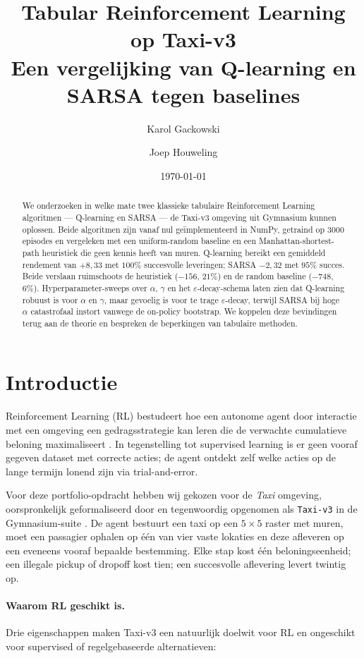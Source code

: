 \documentclass[11pt,a4paper]{article}
\title{\textbf{Tabular Reinforcement Learning op Taxi-v3} \\
       \large Een vergelijking van Q-learning en SARSA tegen baselines}
\author{Karol Gackowski \and Joep Houweling}
\date{\today}
\begin{document}
\maketitle

\begin{abstract}
\noindent
We onderzoeken in welke mate twee klassieke tabulaire Reinforcement
Learning algoritmen --- Q-learning en SARSA --- de Taxi-v3 omgeving uit
Gymnasium kunnen oplossen. Beide algoritmen zijn vanaf nul ge\"implementeerd
in NumPy, getraind op 3000 episodes en vergeleken met een uniform-random
baseline en een Manhattan-shortest-path heuristiek die geen kennis heeft
van muren. Q-learning bereikt een gemiddeld rendement van $+8{,}33$ met
$100\%$ succesvolle leveringen; SARSA $-2{,}32$ met $95\%$ succes. Beide
verslaan ruimschoots de heuristiek ($-156$, $21\%$) en de random baseline
($-748$, $6\%$). Hyperparameter-sweeps over $\alpha$, $\gamma$ en het
$\varepsilon$-decay-schema laten zien dat Q-learning robuust is voor
$\alpha$ en $\gamma$, maar gevoelig is voor te trage $\varepsilon$-decay,
terwijl SARSA bij hoge $\alpha$ catastrofaal instort vanwege de
on-policy bootstrap. We koppelen deze bevindingen terug aan de theorie en
bespreken de beperkingen van tabulaire methoden.
\end{abstract}

\section{Introductie}

Reinforcement Learning (RL) bestudeert hoe een autonome agent door
interactie met een omgeving een gedragsstrategie kan leren die de
verwachte cumulatieve beloning maximaliseert
\cite{sutton_barto_2018}. In tegenstelling tot supervised learning is er
geen vooraf gegeven dataset met correcte acties; de agent ontdekt zelf
welke acties op de lange termijn lonend zijn via trial-and-error.

Voor deze portfolio-opdracht hebben wij gekozen voor de \emph{Taxi}
omgeving, oorspronkelijk geformaliseerd door
\citet{dietterich_2000} en tegenwoordig opgenomen als
\texttt{Taxi-v3} in de Gymnasium-suite \cite{towers_2024}. De agent
bestuurt een taxi op een $5 \times 5$ raster met muren, moet een
passagier ophalen op \'e\'en van vier vaste lokaties en deze afleveren op
een eveneens vooraf bepaalde bestemming. Elke stap kost \'e\'en
beloningseenheid; een illegale pickup of dropoff kost tien; een
succesvolle aflevering levert twintig op.

\paragraph{Waarom RL geschikt is.}
Drie eigenschappen maken Taxi-v3 een natuurlijk doelwit voor RL en
ongeschikt voor supervised of regelgebaseerde alternatieven:
\end{document}
